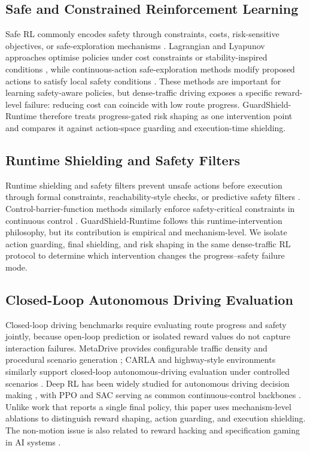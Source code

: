 \documentclass[conference,a4paper]{IEEEtran}
\newcommand{\method}{GuardShield-Runtime}
\begin{document}
\subsection{Safe and Constrained Reinforcement Learning}
Safe RL commonly encodes safety through constraints, costs, risk-sensitive objectives, or safe-exploration mechanisms \cite{garcia2015safe,gu2022review,achiam2017cpo,ray2019benchmarking}. Lagrangian and Lyapunov approaches optimise policies under cost constraints or stability-inspired conditions \cite{chow2018lyapunov,tessler2019reward}, while continuous-action safe-exploration methods modify proposed actions to satisfy local safety conditions \cite{dalal2018safe}. These methods are important for learning safety-aware policies, but dense-traffic driving exposes a specific reward-level failure: reducing cost can coincide with low route progress. \method{} therefore treats progress-gated risk shaping as one intervention point and compares it against action-space guarding and execution-time shielding.

\subsection{Runtime Shielding and Safety Filters}
Runtime shielding and safety filters prevent unsafe actions before execution through formal constraints, reachability-style checks, or predictive safety filters \cite{alshiekh2018safe,fulton2018safe,wabersich2021predictive}. Control-barrier-function methods similarly enforce safety-critical constraints in continuous control \cite{ames2017control,cheng2019end}. \method{} follows this runtime-intervention philosophy, but its contribution is empirical and mechanism-level. We isolate action guarding, final shielding, and risk shaping in the same dense-traffic RL protocol to determine which intervention changes the progress--safety failure mode.

\subsection{Closed-Loop Autonomous Driving Evaluation}
Closed-loop driving benchmarks require evaluating route progress and safety jointly, because open-loop prediction or isolated reward values do not capture interaction failures. MetaDrive provides configurable traffic density and procedural scenario generation \cite{li2022metadrive}; CARLA and highway-style environments similarly support closed-loop autonomous-driving evaluation under controlled scenarios \cite{dosovitskiy2017carla,leurent2018highway}. Deep RL has been widely studied for autonomous driving decision making \cite{kiran2021deep,kendall2019learning,paden2016survey}, with PPO and SAC serving as common continuous-control backbones \cite{schulman2017ppo,haarnoja2018soft}. Unlike work that reports a single final policy, this paper uses mechanism-level ablations to distinguish reward shaping, action guarding, and execution shielding. The non-motion issue is also related to reward hacking and specification gaming in AI systems \cite{amodei2016concrete}.
\end{document}
